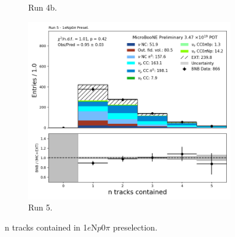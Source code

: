 \begin{figure}[H]
\begin{subfigure}[t]{0.32\linewidth}
        \caption{Run 4b.}
    \end{subfigure}%
    \hspace{0.2cm}%
    \begin{subfigure}[t]{0.32\linewidth}
        \includegraphics[width=\linewidth]{technote/Appendix_Preselection/Figures/1eNp0pi/Run5/n_tracks_contained_Run5_1eNp0pi_Presel.png}
        \caption{Run 5.}
    \end{subfigure}
    \caption{n tracks contained in 1$e$N$p$0$\pi$ preselection.}
\end{figure}

